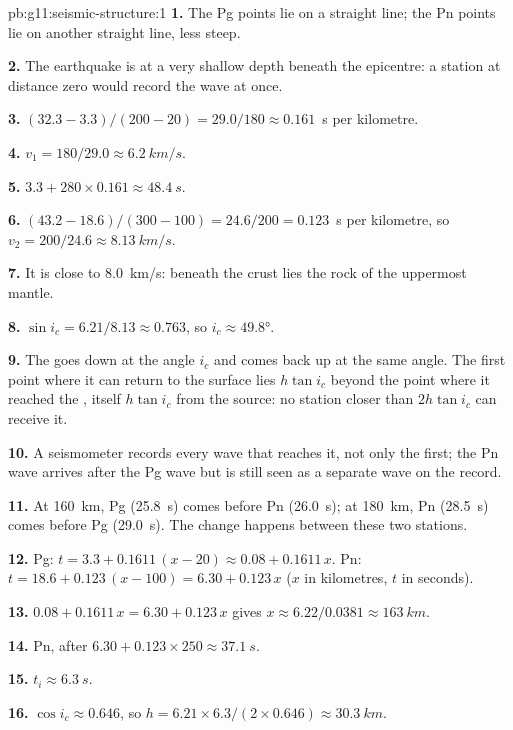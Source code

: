 \begin{solution}{pb:g11:seismic-structure:1}
\textbf{1.} The Pg points lie on a straight line; the Pn points lie on
another straight line, less steep.

\textbf{2.} The earthquake is at a very shallow depth beneath the epicentre:
a station at distance zero would record the wave at once.

\textbf{3.} $(32.3 - 3.3)/(200 - 20) = 29.0/180 \approx \num{0.161}$~\unit{s}
per kilometre.

\textbf{4.} $v_1 = 180/29.0 \approx \qty{6.2}{km/s}$.

\textbf{5.} $3.3 + 280 \times 0.161 \approx \qty{48.4}{s}$.

\textbf{6.} $(43.2 - 18.6)/(300 - 100) = 24.6/200 = \num{0.123}$~\unit{s}
per kilometre, so $v_2 = 200/24.6 \approx \qty{8.13}{km/s}$.

\textbf{7.} It is close to \qty{8.0}{km/s}: beneath the crust lies the rock
of the uppermost mantle.

\textbf{8.} $\sin i_c = 6.21/8.13 \approx 0.763$, so $i_c \approx
\ang{49.8}$.

\textbf{9.} The  goes down at the angle $i_c$ and comes back up at
the same angle. The first point where it can return to the surface lies
$h\tan i_c$ beyond the point where it reached the , itself $h\tan i_c$
from the source: no station closer than $2h\tan i_c$ can receive it.

\textbf{10.} A seismometer records every wave that reaches it, not only the
first; the Pn wave arrives after the Pg wave but is still seen as a separate
wave on the record.

\textbf{11.} At \qty{160}{km}, Pg (\qty{25.8}{s}) comes before Pn
(\qty{26.0}{s}); at \qty{180}{km}, Pn (\qty{28.5}{s}) comes before Pg
(\qty{29.0}{s}). The change happens between these two stations.

\textbf{12.} Pg: $t = 3.3 + 0.1611\,(x - 20) \approx 0.08 + 0.1611\,x$. Pn:
$t = 18.6 + 0.123\,(x - 100) = 6.30 + 0.123\,x$ ($x$ in kilometres, $t$ in
seconds).

\textbf{13.} $0.08 + 0.1611\,x = 6.30 + 0.123\,x$ gives $x \approx
6.22/0.0381 \approx \qty{163}{km}$.

\textbf{14.} Pn, after $6.30 + 0.123 \times 250 \approx \qty{37.1}{s}$.

\textbf{15.} $t_i \approx \qty{6.3}{s}$.

\textbf{16.} $\cos i_c \approx 0.646$, so $h = 6.21 \times 6.3/(2 \times
0.646) \approx \qty{30.3}{km}$.


\end{solution}

